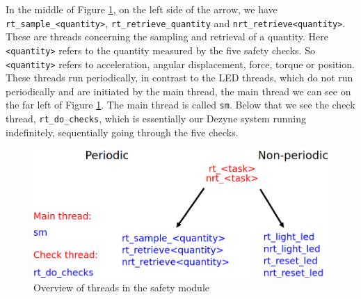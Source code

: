 \documentclass[12pt]{scrreprt}
\begin{document}
\par
In the middle of Figure \ref{fig:threads_overview}, on the left side of the arrow, we have \texttt{rt\_sample\_<quantity>}, \texttt{rt\_retrieve\_quantity} and \texttt{nrt\_retrieve<quantity>}. These are threads concerning the sampling and retrieval of a quantity. Here \texttt{<quantity>} refers to the quantity measured by the five safety checks. So \texttt{<quantity>} refers to acceleration, angular displacement, force, torque or position. These threads run periodically, in contrast to the LED threads, which do not run periodically and are initiated by the main thread, the main thread we can see on the far left of Figure \ref{fig:threads_overview}. The main thread is called \texttt{sm}. Below that we see the check thread, \texttt{rt\_do\_checks}, which is essentially our Dezyne system running indefinitely, sequentially going through the five checks.

\begin{figure}[H]
    \centering
    \includegraphics[width=\textwidth]{Figures/results/modelling_figures/Threading/threads_overview.png}
    \caption{Overview of threads in the safety module}
    \label{fig:threads_overview}
\end{figure}
\end{document}
